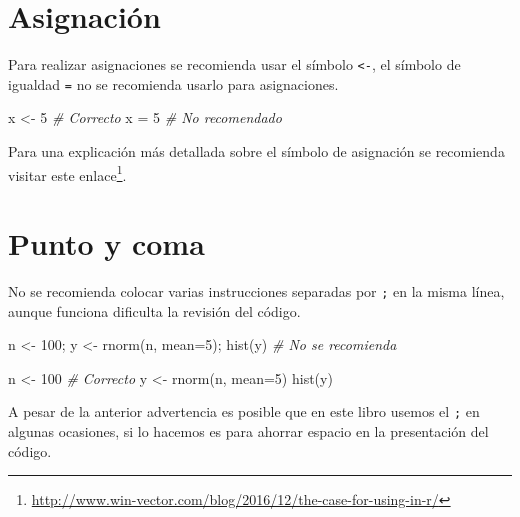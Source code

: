 \documentclass[
]{book}
\makeatletter
\newenvironment{Shaded}{\begin{snugshade}}{\end{snugshade}}
\newcommand{\AttributeTok}[1]{\textcolor[rgb]{0.77,0.63,0.00}{#1}}
\newcommand{\CommentTok}[1]{\textcolor[rgb]{0.56,0.35,0.01}{\textit{#1}}}
\newcommand{\DecValTok}[1]{\textcolor[rgb]{0.00,0.00,0.81}{#1}}
\newcommand{\FunctionTok}[1]{\textcolor[rgb]{0.00,0.00,0.00}{#1}}
\newcommand{\NormalTok}[1]{#1}
\newcommand{\OtherTok}[1]{\textcolor[rgb]{0.56,0.35,0.01}{#1}}
\renewcommand{\href}[2]{#2\footnote{\url{#1}}}
\newenvironment{kframe}{%
\medskip{}
\setlength{\fboxsep}{.8em}
 \def\at@end@of@kframe{}%
 \ifinner\ifhmode%
  \def\at@end@of@kframe{\end{minipage}}%
  \begin{minipage}{\columnwidth}%
 \fi\fi%
 \def\FrameCommand##1{\hskip\@totalleftmargin \hskip-\fboxsep
 \colorbox{shadecolor}{##1}\hskip-\fboxsep
     \hskip-\linewidth \hskip-\@totalleftmargin \hskip\columnwidth}%
 \MakeFramed {\advance\hsize-\width
   \@totalleftmargin\z@ \linewidth\hsize
   \@setminipage}}%
 {\par\unskip\endMakeFramed%
 \at@end@of@kframe}
\renewenvironment{Shaded}{\begin{kframe}}{\end{kframe}}
\makeatother
\begin{document}
\hypertarget{asignaciuxf3n}{%
\section{Asignación}\label{asignaciuxf3n}}

Para realizar asignaciones se recomienda usar el símbolo \texttt{\textless{}-}, el símbolo de igualdad \texttt{=} no se recomienda usarlo para asignaciones.

\begin{Shaded}
\begin{Highlighting}[]
\NormalTok{x }\OtherTok{\textless{}{-}} \DecValTok{5}  \CommentTok{\# Correcto}
\NormalTok{x }\OtherTok{=} \DecValTok{5}   \CommentTok{\# No recomendado}
\end{Highlighting}
\end{Shaded}

Para una explicación más detallada sobre el símbolo de asignación se recomienda visitar este \href{http://www.win-vector.com/blog/2016/12/the-case-for-using-in-r/}{enlace}.

\hypertarget{punto-y-coma}{%
\section{Punto y coma}\label{punto-y-coma}}

No se recomienda colocar varias instrucciones separadas por \texttt{;} en la misma línea, aunque funciona dificulta la revisión del código.

\begin{Shaded}
\begin{Highlighting}[]
\NormalTok{n }\OtherTok{\textless{}{-}} \DecValTok{100}\NormalTok{; y }\OtherTok{\textless{}{-}} \FunctionTok{rnorm}\NormalTok{(n, }\AttributeTok{mean=}\DecValTok{5}\NormalTok{); }\FunctionTok{hist}\NormalTok{(y)  }\CommentTok{\# No se recomienda}

\NormalTok{n }\OtherTok{\textless{}{-}} \DecValTok{100}                                  \CommentTok{\# Correcto}
\NormalTok{y }\OtherTok{\textless{}{-}} \FunctionTok{rnorm}\NormalTok{(n, }\AttributeTok{mean=}\DecValTok{5}\NormalTok{)}
\FunctionTok{hist}\NormalTok{(y)}
\end{Highlighting}
\end{Shaded}

A pesar de la anterior advertencia es posible que en este libro usemos el \texttt{;} en algunas ocasiones, si lo hacemos es para ahorrar espacio en la presentación del código.
\end{document}
